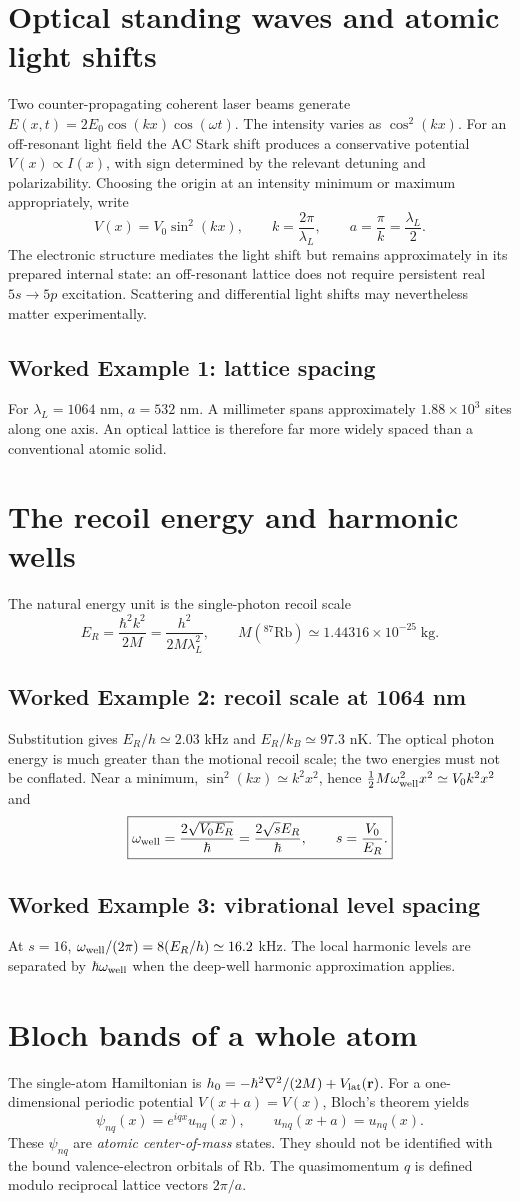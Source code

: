 \documentclass[11pt,a4paper]{article}
\newcommand{\ex}[1]{\subsection*{Worked Example #1}}
\begin{document}
\section{Optical standing waves and atomic light shifts}
Two counter-propagating coherent laser beams generate $E(x,t)=2E_0\cos(kx)\cos(\omega t)$. The intensity varies as $\cos^2(kx)$. For an off-resonant light field the AC Stark shift produces a conservative potential $V(x)\propto I(x)$, with sign determined by the relevant detuning and polarizability. Choosing the origin at an intensity minimum or maximum appropriately, write
\begin{equation}\boxed{V(x)=V_0\sin^2(kx),\qquad k=\frac{2\pi}{\lambda_L},\qquad a=\frac{\pi}{k}=\frac{\lambda_L}{2}.}\end{equation}
The electronic structure mediates the light shift but remains approximately in its prepared internal state: an off-resonant lattice does not require persistent real $5s\to5p$ excitation. Scattering and differential light shifts may nevertheless matter experimentally.
\ex{1: lattice spacing} For $\lambda_L=1064$ nm, $a=532$ nm. A millimeter spans approximately $1.88\times10^3$ sites along one axis. An optical lattice is therefore far more widely spaced than a conventional atomic solid.
\section{The recoil energy and harmonic wells}
The natural energy unit is the single-photon recoil scale
\begin{equation}\boxed{E_R=\frac{\hbar^2k^2}{2M}=\frac{h^2}{2M\lambda_L^2},\qquad M(^{87}\mathrm{Rb})\simeq1.44316\times10^{-25}\;\mathrm{kg}.}\end{equation}
\ex{2: recoil scale at 1064 nm} Substitution gives $E_R/h\simeq2.03$ kHz and $E_R/k_B\simeq97.3$ nK. The optical photon energy is much greater than the motional recoil scale; the two energies must not be conflated.
Near a minimum, $\sin^2(kx)\simeq k^2x^2$, hence $\tfrac12M\omega_{\rm well}^2x^2\simeq V_0k^2x^2$ and
\begin{equation}\boxed{\omega_{\rm well}=\frac{2\sqrt{V_0E_R}}{\hbar}=\frac{2\sqrt{s}E_R}{\hbar},\qquad s=\frac{V_0}{E_R}.}\end{equation}
\ex{3: vibrational level spacing} At $s=16$, $\omega_{\rm well}/(2\pi)=8(E_R/h)\simeq16.2$ kHz. The local harmonic levels are separated by $\hbar\omega_{\rm well}$ when the deep-well harmonic approximation applies.
\section{Bloch bands of a whole atom}
The single-atom Hamiltonian is $h_0=-\hbar^2\nabla^2/(2M)+V_{\rm lat}(\mathbf r)$. For a one-dimensional periodic potential $V(x+a)=V(x)$, Bloch's theorem yields
\begin{equation}\boxed{\psi_{nq}(x)=e^{iqx}u_{nq}(x),\qquad u_{nq}(x+a)=u_{nq}(x).}\end{equation}
These $\psi_{nq}$ are \emph{atomic center-of-mass} states. They should not be identified with the bound valence-electron orbitals of Rb. The quasimomentum $q$ is defined modulo reciprocal lattice vectors $2\pi/a$.
\end{document}
